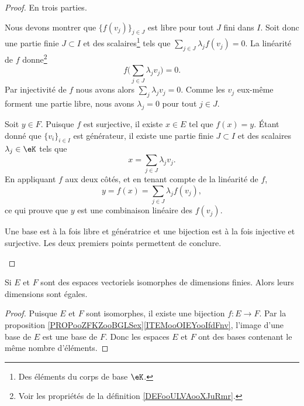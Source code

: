 \begin{proof}
	En trois parties.
	\begin{subproof}
		\spitem[\ref{ITEMooPPMEooIaZqtm}]
		Nous devons montrer que \( \{f(v_j)\}_{j\in J}\) est libre pour tout \( J\) fini dans \( I\). Soit donc une partie finie \( J\subset I\) et des scalaires\footnote{Des éléments du corps de base \( \eK\).} tels que \( \sum_{j\in J}\lambda_jf(v_j)=0\). La linéarité de \( f\) donne\footnote{Voir les propriétés de la définition \ref{DEFooULVAooXJuRmr}.}
		\begin{equation}
			f\big( \sum_{j\in J}\lambda_jv_j \big)=0.
		\end{equation}
		Par injectivité de \( f\) nous avons alors \( \sum_j\lambda_jv_j=0\). Comme les \( v_j\) eux-même forment une partie libre, nous avons \( \lambda_j=0\) pour tout \( j\in J\).

		\spitem[\ref{ITEMooOZSPooQBrDGi}]
		Soit \( y\in F\). Puisque \( f\) est surjective, il existe \( x\in E\) tel que \( f(x)=y\). Étant donné que \( \{v_i\}_{i\in I}\) est générateur, il existe une partie finie \( J\subset I\) et des scalaires \( \lambda_j\in \eK\) tels que
		\begin{equation}
			x=\sum_{j\in J}\lambda_jv_j.
		\end{equation}
		En appliquant \( f\) aux deux côtés, et en tenant compte de la linéarité de \( f\),
		\begin{equation}
			y=f(x)=\sum_{j\in J}\lambda_jf(v_j),
		\end{equation}
		ce qui prouve que \( y\) est une combinaison linéaire des \( f(v_j)\).

		\spitem[\ref{ITEMooOIEYooIfdFnv}]
		Une base est à la fois libre et génératrice et une bijection est à la fois injective et surjective. Les deux premiers points permettent de conclure.
	\end{subproof}
\end{proof}

\begin{corollary}        \label{CORooXIPKooWThOsr}
	Si \( E\) et \( F\) sont des espaces vectoriels isomorphes de dimensions finies. Alors leurs dimensions sont égales.
\end{corollary}

\begin{proof}
	Puisque \( E\) et \( F\) sont isomorphes, il existe une bijection \( f\colon E\to F\). Par la proposition \ref{PROPooZFKZooBGLSex}\ref{ITEMooOIEYooIfdFnv}, l'image d'une base de \( E\) est une base de \( F\). Donc les espaces \( E\) et \( F\) ont des bases contenant le même nombre d'éléments.
\end{proof}

